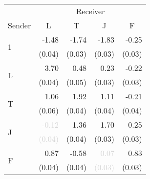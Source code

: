 \begin{tabular}{lrrrr}
\toprule
& \multicolumn{4}{c}{Receiver} \\
\cmidrule(l){2-5} 
Sender & \multicolumn{1}{c}{L} & \multicolumn{1}{c}{T} & \multicolumn{1}{c}{J} & \multicolumn{1}{c}{F} \\
\midrule
\multirow{2}{*}{1} &-1.48 &-1.74 &-1.83 &-0.25\\
 &\tiny{(0.04)} &\tiny{(0.03)} &\tiny{(0.03)} &\tiny{(0.03)}\\[1ex]
\multirow{2}{*}{L} &\cellcolor{Gray}3.70 &0.48 &0.23 &-0.22\\
 &\cellcolor{Gray}\tiny{(0.04)} &\tiny{(0.05)} &\tiny{(0.03)} &\tiny{(0.03)}\\[1ex]
\multirow{2}{*}{T} &1.06 &\cellcolor{Gray}1.92 &1.11 &-0.21\\
 &\tiny{(0.06)} &\cellcolor{Gray}\tiny{(0.04)} &\tiny{(0.04)} &\tiny{(0.04)}\\[1ex]
\multirow{2}{*}{J} &\textcolor{LightGray}{-0.12} &1.36 &\cellcolor{Gray}1.70 &0.25\\
 &\textcolor{LightGray}{\tiny{(0.04)}} &\tiny{(0.04)} &\cellcolor{Gray}\tiny{(0.03)} &\tiny{(0.03)}\\[1ex]
\multirow{2}{*}{F} &0.87 &-0.58 &\textcolor{LightGray}{0.07} &\cellcolor{Gray}0.83\\
 &\tiny{(0.04)} &\tiny{(0.04)} &\textcolor{LightGray}{\tiny{(0.03)}} &\cellcolor{Gray}\tiny{(0.03)}\\[1ex]
\bottomrule
\end{tabular}
